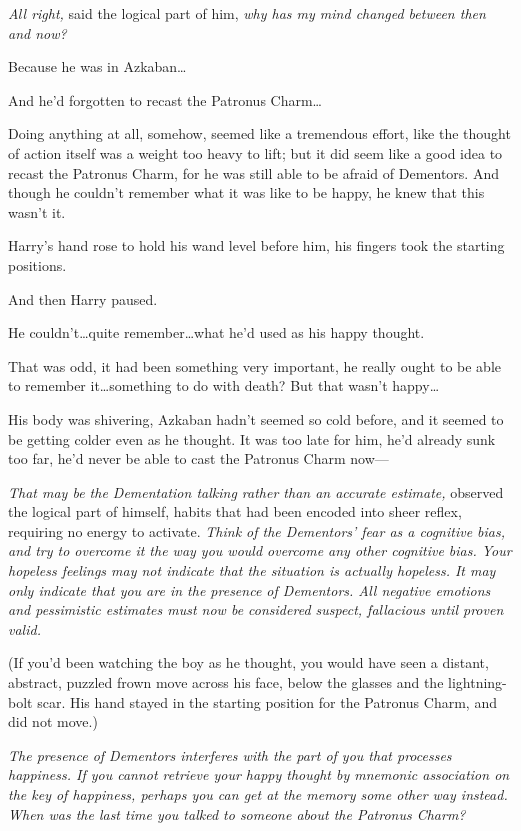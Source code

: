 \emph{All right,} said the logical part of him, \emph{why has my mind changed between then and now?}

Because he was in Azkaban…

And he’d forgotten to recast the Patronus Charm…

Doing anything at all, somehow, seemed like a tremendous effort, like the thought of action itself was a weight too heavy to lift; but it did seem like a good idea to recast the Patronus Charm, for he was still able to be afraid of Dementors. And though he couldn’t remember what it was like to be happy, he knew that this wasn’t it.

Harry’s hand rose to hold his wand level before him, his fingers took the starting positions.

And then Harry paused.

He couldn’t…quite remember…what he’d used as his happy thought.

That was odd, it had been something very important, he really ought to be able to remember it…something to do with death? But that wasn’t happy…

His body was shivering, Azkaban hadn’t seemed so cold before, and it seemed to be getting colder even as he thought. It was too late for him, he’d already sunk too far, he’d never be able to cast the Patronus Charm now—

\emph{That may be the Dementation talking rather than an accurate estimate,} observed the logical part of himself, habits that had been encoded into sheer reflex, requiring no energy to activate. \emph{Think of the Dementors’ fear as a cognitive bias, and try to overcome it the way you would overcome any other cognitive bias. Your hopeless feelings may not indicate that the situation is actually hopeless. It may only indicate that you are in the presence of Dementors. All negative emotions and pessimistic estimates must now be considered suspect, fallacious until proven valid.}

(If you’d been watching the boy as he thought, you would have seen a distant, abstract, puzzled frown move across his face, below the glasses and the lightning-bolt scar. His hand stayed in the starting position for the Patronus Charm, and did not move.)

\emph{The presence of Dementors interferes with the part of you that processes happiness. If you cannot retrieve your happy thought by mnemonic association on the key of happiness, perhaps you can get at the memory some other way instead. When was the last time you talked to someone about the Patronus Charm?}

